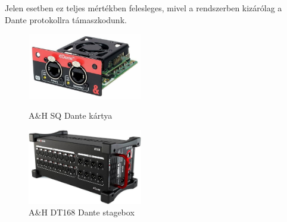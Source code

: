 Jelen esetben ez teljes mértékben felesleges, mivel a rendszerben kizárólag a Dante protokollra támaszkodunk.
\begin{figure}[H]
    \centering
    \begin{minipage}{0.45\textwidth}
        \centering
        \includegraphics[width=50mm, keepaspectratio]{figures/sq_dante.jpg}
        \caption{A\&H SQ Dante kártya}\label{fig:sq_dante}
    \end{minipage}\hfill
    \begin{minipage}{0.45\textwidth}
        \centering
        \includegraphics[width=50mm, keepaspectratio]{figures/dt168.jpg}
        \caption{A\&H DT168 Dante stagebox}\label{fig:dt168}
    \end{minipage}
\end{figure}
